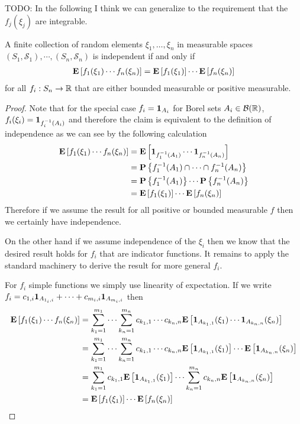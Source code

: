 TODO: In the following I think we can generalize to the requirement
that the $f_j(\xi_j)$ are integrable.
\begin{lem}\label{IndependenceExpectations}A
  finite collection of random elements $\xi_1, \dots, \xi_n$ in
  measurable spaces $(S_1,\mathcal{S}_1), \cdots, (S_n,
  \mathcal{S}_n)$ is
  independent if and only if 
\begin{align*}
\textbf{E}\left[f_1(\xi_1) \cdots f_n(\xi_n)\right] =
  \textbf{E}\left[f_1(\xi_1)\right] \cdots \textbf{E}\left[f_n(\xi_n)\right]
\end{align*}
for all $f_i : S_n \to \mathbb{R}$ that are either bounded
measurable or positive measurable.
\end{lem}
\begin{proof}
Note that for the special case $f_i = \textbf{1}_{A_i}$ for 
Borel sets $A_i \in \mathcal{B}(\mathbb{R})$, $f_i(\xi_i) =
\textbf{1}_{f_i^{-1}(A_i)}$ and therefore the claim is equivalent to
the definition of independence as we can see by the following
calculation
\begin{align*}
\textbf{E}\left[f_1(\xi_1) \cdots f_n(\xi_n)\right] &=
\textbf{E}\left[\textbf{1}_{f_1^{-1}(A_1)} \cdots
  \textbf{1}_{f_n^{-1}(A_n)}\right] \\
&= \textbf{P}\left \{f_1^{-1}(A_1) \cap \cdots \cap f_n^{-1}(A_n) \right \} \\
&= \textbf{P}\left \{f_1^{-1}(A_1)  \right \} \cdots \textbf{P}\left \{f_n^{-1}(A_n) \right \} \\
&=\textbf{E}\left[f_1(\xi_1)\right] \cdots \textbf{E}\left[f_n(\xi_n)\right]
\end{align*}
Therefore if we assume the result for all positive or bounded measurable
$f$ then we certainly have independence.  

On the other hand if we assume independence of the $\xi_i$ then we
know that the desired result holds for $f_i$ that are indicator
functions.  It remains to apply the standard machinery to derive the
result for more general $f_i$.

For $f_i$ simple functions we simply use linearity of expectation.  If
we write $f_i = c_{1,i} \textbf{1}_{A _{1_i,i}} + \cdots + c_{m_i,i}
\textbf{1}_{A _{m_i, i}}$ then 
\begin{align*}
\textbf{E}\left[f_1(\xi_1) \cdots f_n(\xi_n)\right] &= \sum_{k_1 = 1}^{m_1}
\cdots \sum_{k_n = 1}^{m_n} c_{k_1, 1} \cdots c_{k_n, n}
\textbf{E}\left[\textbf{1}_{A_{k_1,1}}(\xi_1)
  \cdots\textbf{1}_{A_{k_n,n}}(\xi_n)\right] \\
&= \sum_{k_1 = 1}^{m_1}
\cdots \sum_{k_n = 1}^{m_n} c_{k_1, 1} \cdots c_{k_n, n}
\textbf{E}\left[\textbf{1}_{A_{k_1,1}}(\xi_1)\right] \cdots
\textbf{E}\left[\textbf{1}_{A_{k_n,n}}(\xi_n)\right] \\
&= \sum_{k_1 = 1}^{m_1} c_{k_1, 1} \textbf{E}\left[\textbf{1}_{A_{k_1,1}}(\xi_1)\right] 
\cdots \sum_{k_n = 1}^{m_n} c_{k_n, n}
\textbf{E}\left[\textbf{1}_{A_{k_n,n}}(\xi_n)\right] \\
&=\textbf{E}\left[f_1(\xi_1)\right] \cdots \textbf{E}\left[f_n(\xi_n)\right]
\end{align*}


\end{proof}
